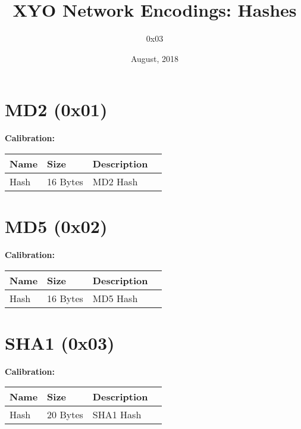 \documentclass[11pt]{article}
\title{XYO Network Encodings: Hashes}
\author{0x03}
\date{August, 2018}
\begin{document}
\maketitle

\section{MD2 (0x01)}
\textbf{Calibration:}


\begin{center}
\begin{tabular}{ |l|l|l|l| } 
\hline
\textbf{Name} & \textbf{Size} & \textbf{Description}\\
\hline
Hash & 16 Bytes & MD2 Hash\\   
\hline
\end{tabular}
\end{center}

\section{MD5 (0x02)}
\textbf{Calibration:}


\begin{center}
\begin{tabular}{ |l|l|l|l| } 
\hline
\textbf{Name} & \textbf{Size} & \textbf{Description}\\
\hline
Hash & 16 Bytes & MD5 Hash\\   
\hline
\end{tabular}
\end{center}

\section{SHA1 (0x03)}
\textbf{Calibration:}


\begin{center}
\begin{tabular}{ |l|l|l|l| } 
\hline
\textbf{Name} & \textbf{Size} & \textbf{Description}\\
\hline
Hash & 20 Bytes & SHA1 Hash\\   
\hline
\end{tabular}
\end{center}
\end{document}
